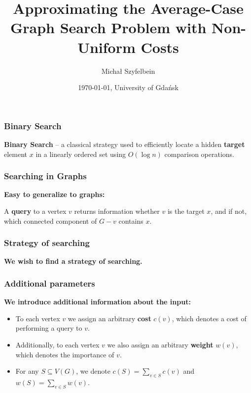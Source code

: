\documentclass{beamer}
\title{Approximating the Average-Case Graph Search Problem with Non-Uniform Costs}
\author{Michał Szyfelbein}
\institute{Faculty of Electronics, Telecommunications and Informatics\\Gdańsk University of Technology, Poland}
\date{\today, University of Gdańsk}
\newcommand{\br}[1]{\mathopen{}\left( #1 \right)}
\begin{document}

\usetikzlibrary {graphs,graphdrawing} 

\frame{\titlepage}

\begin{frame}
\frametitle{Binary Search}
\textbf{Binary Search} – a classical strategy used to efficiently locate a hidden \textbf{target} element $x$ in a linearly ordered set using $O\br{\log n}$ comparison operations.
\pause


\end{frame}

\begin{frame}
\frametitle{Searching in Graphs}
\textbf{Easy to generalize to graphs:} 

A \textbf{query} to a vertex $v$ returns information whether $v$ is the target $x$, and if not, which connected component of $G-v$ contains $x$.
\pause


\end{frame}
\begin{frame}\frametitle{Strategy of searching}

\textbf{We wish to find a strategy of searching.}

\end{frame}

\begin{frame}\frametitle{Additional parameters}
    \textbf{We introduce additional information about the input:}
    \begin{itemize}
        \item 
    To each vertex $v$ we assign an arbitrary \textbf{cost} $c\br{v}$, which denotes a cost of performing a query to $v$.
    \pause
    \item 
    Additionally, to each vertex $v$ we also assign an arbitrary \textbf{weight} $w\br{v}$, which denotes the importance of $v$.
    \pause
    \item For any $S\subseteq V\br{G}$, we denote $c\br{S}=\sum_{v\in S}c\br{v}$ and $w\br{S}=\sum_{v\in S}w\br{v}$.
    \end{itemize}

\end{frame}
\end{document}
